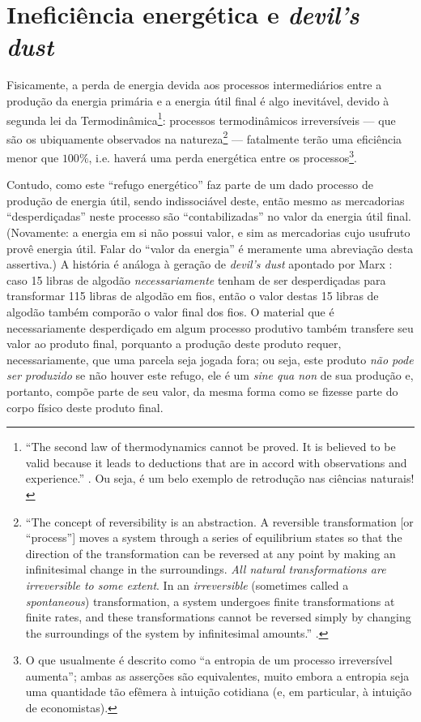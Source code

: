 \documentclass[12pt]{article}
\begin{document}
\section{Ineficiência energética e \textit{devil's dust}}
Fisicamente, a perda de energia devida aos processos intermediários entre a produção da energia primária e a energia útil final é algo inevitável, devido à segunda lei da Termodinâmica\footnote{``The second law of thermodynamics cannot be proved. It is believed to be valid because it leads to deductions that are in accord with observations and
experience.'' \cite[p. 100]{Wallace2006}. Ou seja, é um belo exemplo de retrodução \cite{Bhaskar1978} nas ciências naturais!}: processos termodinâmicos irreversíveis --- que são os ubiquamente observados na natureza\footnote{``The concept of reversibility is an abstraction. A reversible transformation [or ``process''] moves a system through a series of equilibrium states so that the direction of the
transformation can be reversed at any point by making
an infinitesimal change in the surroundings. \textit{All natural
transformations are irreversible to some extent}. In an \textit{irreversible} (sometimes called a \textit{spontaneous}) transformation, a system undergoes finite transformations at
finite rates, and these transformations cannot be
reversed simply by changing the surroundings of the
system by infinitesimal amounts.'' \cite[p. 100; grifo no original]{Wallace2006}. } --- fatalmente terão uma eficiência menor que $100\%$, i.e. haverá uma perda energética entre os processos\footnote{O que usualmente é descrito como ``a entropia de um processo irreversível aumenta''; ambas as asserções são equivalentes, muito embora a entropia seja uma quantidade tão efêmera à intuição cotidiana (e, em particular, à intuição de economistas).}. 

Contudo, como este ``refugo energético'' faz parte de um dado processo de produção de energia útil, sendo indissociável deste, então mesmo as mercadorias ``desperdiçadas'' neste processo são ``contabilizadas'' no valor da energia útil final. (Novamente: a energia em si não possui valor, e sim as mercadorias cujo usufruto provê energia útil. Falar do ``valor da energia'' é meramente uma abreviação desta assertiva.) A história é análoga à geração de \textit{devil's dust} apontado por Marx \cite[p. 282]{Marx2017}: caso 15 libras de algodão \textit{necessariamente} tenham de ser desperdiçadas para transformar 115 libras de algodão em fios, então o valor destas 15 libras de algodão também comporão o valor final dos fios. O material que é necessariamente desperdiçado em algum processo produtivo também transfere seu valor ao produto final, porquanto a produção deste produto requer, necessariamente, que uma parcela seja jogada fora; ou seja, este produto \textit{não pode ser produzido} se não houver este refugo, ele é um \textit{sine qua non} de sua produção e, portanto, compõe parte de seu valor, da mesma forma como se fizesse parte do corpo físico deste produto final. 
\end{document}
